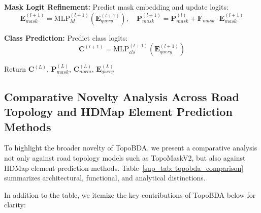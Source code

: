 \begin{algorithm}[t]
\begin{algorithmic}[1]
    \STATE \textbf{Mask Logit Refinement:}
    \STATE \quad Predict mask embedding and update logits:
    \[
    \mathbf{E}_{mask}^{(l+1)} = \text{MLP}_M^{(l+1)}(\mathbf{E}_{query}^{(l+1)}), \quad
    \mathbf{P}_{mask}^{(l+1)} = \mathbf{P}_{mask}^{(l)} + \mathbf{F}_{mask} \cdot \mathbf{E}_{mask}^{(l+1)}
    \]

    \STATE \textbf{Class Prediction:}
    \STATE \quad Predict class logits:
    \[
    \mathbf{C}^{(l+1)} = \text{MLP}_{cls}^{(l+1)}(\mathbf{E}_{query}^{(l+1)})
    \]
\ENDFOR

\STATE Return $\mathbf{C}^{(L)}$, $\mathbf{P}_{mask}^{(L)}$, $\mathbf{C}_{norm}^{(L)}$, $\mathbf{E}_{query}^{(L)}$
\end{algorithmic}
\end{algorithm}


\subsection{Comparative Novelty Analysis Across Road Topology and HDMap Element Prediction Methods}
\label{sup_sec: novelty_analysis_section}

To highlight the broader novelty of TopoBDA, we present a comparative analysis not only against road topology models such as TopoMaskV2, but also against HDMap element prediction methods. Table~\ref{sup_tab: topobda_comparison} summarizes architectural, functional, and analytical distinctions.

In addition to the table, we itemize the key contributions of TopoBDA below for clarity:

